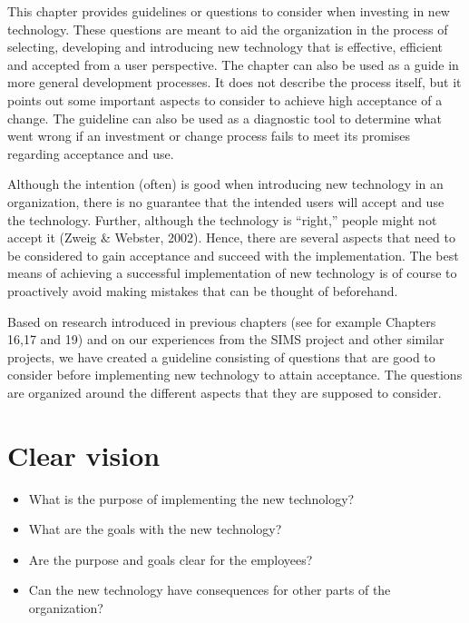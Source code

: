 \documentclass[
  12pt,
]{scrbook}
\begin{document}
This chapter provides guidelines or questions to consider when investing in new technology. These questions are meant to aid the organization in the process of selecting, developing and introducing new technology that is effective, efficient and accepted from a user perspective. The chapter can also be used as a guide in more general development processes. It does not describe the process itself, but it points out some important aspects to consider to achieve high acceptance of a change. The guideline can also be used as a diagnostic tool to determine what went wrong if an investment or change process fails to meet its promises regarding acceptance and use.~

Although the intention (often) is good when introducing new technology in an organization, there is no guarantee that the intended users will accept and use the technology. Further, although the technology is ``right,'' people might not accept it (Zweig \& Webster, 2002). Hence, there are several aspects that need to be considered to gain acceptance and succeed with the implementation. The best means of achieving a successful implementation of new technology is of course to proactively avoid making mistakes that can be thought of beforehand.~

Based on research introduced in previous chapters (see for example Chapters 16,17 and 19) and on our experiences from the SIMS project and other similar projects, we have created a guideline consisting of questions that are good to consider before implementing new technology to attain acceptance. The questions are organized around the different aspects that they are supposed to consider.

\hypertarget{clear-vision}{%
\section*{Clear vision~}\label{clear-vision}}

\begin{itemize}
\item
  What is the purpose of implementing the new technology?
\item
  What are the goals with the new technology?
\item
  Are the purpose and goals clear for the employees?
\item
  Can the new technology have consequences for other parts of the organization?
\end{itemize}
\end{document}
